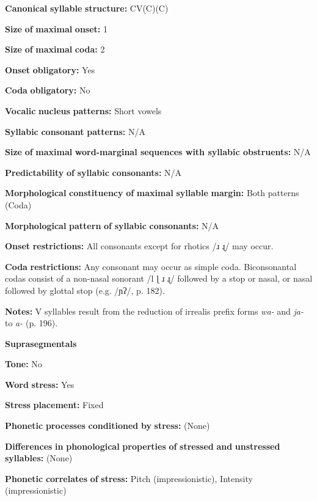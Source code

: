 \begin{styleBody}
\textbf{Canonical} \textbf{syllable} \textbf{structure:} CV(C)(C) \citep[186-96]{Merlan1989}

\textbf{Size} \textbf{of} \textbf{maximal} \textbf{onset:} 1

\textbf{Size} \textbf{of} \textbf{maximal} \textbf{coda:} 2

\textbf{Onset} \textbf{obligatory:} Yes

\textbf{Coda} \textbf{obligatory:} No

\textbf{Vocalic} \textbf{nucleus} \textbf{patterns:} Short vowels

\textbf{Syllabic} \textbf{consonant} \textbf{patterns:} N/A

\textbf{Size} \textbf{of} \textbf{maximal} \textbf{word{}-marginal sequences with syllabic obstruents:} N/A

\textbf{Predictability} \textbf{of} \textbf{syllabic} \textbf{consonants:} N/A

\textbf{Morphological} \textbf{constituency} \textbf{of} \textbf{maximal} \textbf{syllable} \textbf{margin:} Both patterns (Coda)

\textbf{Morphological} \textbf{pattern} \textbf{of} \textbf{syllabic} \textbf{consonants:} N/A

\textbf{Onset} \textbf{restrictions:} All consonants except for rhotics /ɹ ɻ/ may occur.

\textbf{Coda} \textbf{restrictions:} Any consonant may occur as simple coda. Biconsonantal codas consist of a non-nasal sonorant /l ɭ ɹ ɻ/ followed by a stop or nasal, or nasal followed by glottal stop (e.g. /ɲʔ/, p. 182).

\textbf{Notes:} V syllables result from the reduction of irrealis prefix forms \textit{wa-} and \textit{ja-} to \textit{a-} (p. 196).

\textbf{Suprasegmentals}

\textbf{Tone:} No

\textbf{Word} \textbf{stress:} Yes

\textbf{Stress} \textbf{placement:} Fixed

\textbf{Phonetic} \textbf{processes} \textbf{conditioned} \textbf{by} \textbf{stress:} (None)

\textbf{Differences} \textbf{in} \textbf{phonological} \textbf{properties} \textbf{of} \textbf{stressed} \textbf{and} \textbf{unstressed} \textbf{syllables:} (None)

\textbf{Phonetic} \textbf{correlates} \textbf{of} \textbf{stress:} Pitch (impressionistic), Intensity (impressionistic)


\end{styleBody}

